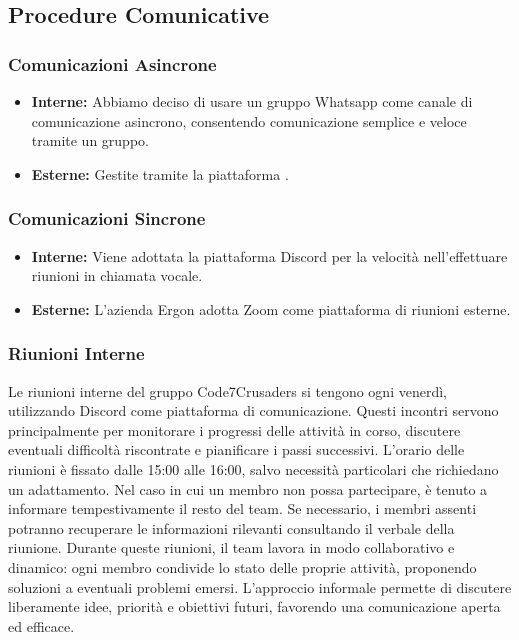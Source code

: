 \subsection{Procedure Comunicative}

\subsubsection{Comunicazioni Asincrone}
\begin{itemize}
    \item \textbf{Interne:} Abbiamo deciso di usare un gruppo Whatsapp come canale di comunicazione asincrono, consentendo comunicazione semplice e veloce tramite un gruppo.
    \item \textbf{Esterne:} Gestite tramite la piattaforma .
\end{itemize}

\subsubsection{Comunicazioni Sincrone}
\begin{itemize}
    \item \textbf{Interne:} Viene adottata la piattaforma Discord per la velocità nell'effettuare riunioni in chiamata vocale.
    \item \textbf{Esterne:} L'azienda Ergon adotta Zoom come piattaforma di riunioni esterne.
\end{itemize}

\subsubsection{Riunioni Interne}
Le riunioni interne del gruppo Code7Crusaders si tengono ogni venerdì, utilizzando Discord come piattaforma di comunicazione. Questi incontri servono principalmente per monitorare i progressi delle attività in corso, discutere eventuali difficoltà riscontrate e pianificare i passi successivi. L’orario delle riunioni è fissato dalle 15:00 alle 16:00, salvo necessità particolari che richiedano un adattamento.
Nel caso in cui un membro non possa partecipare, è tenuto a informare tempestivamente il resto del team. Se necessario, i membri assenti potranno recuperare le informazioni rilevanti consultando il verbale della riunione.
Durante queste riunioni, il team lavora in modo collaborativo e dinamico: ogni membro condivide lo stato delle proprie attività, proponendo soluzioni a eventuali problemi emersi. L'approccio informale permette di discutere liberamente idee, priorità e obiettivi futuri, favorendo una comunicazione aperta ed efficace.

